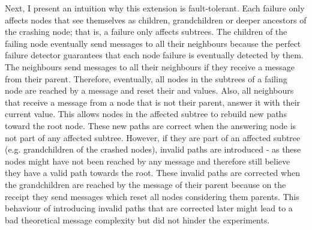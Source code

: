 Next, I present an intuition why this extension is fault-tolerant.
Each failure only affects nodes that see themselves as children, grandchildren or deeper ancestors of the crashing node; that is, a failure only affects subtrees.
The children of the failing node eventually send  messages to all their neighbours because the perfect failure detector guarantees that each node failure is eventually detected by them.
The neighbours send  messages to all their neighbours if they receive a  message from their parent.
Therefore, eventually, all nodes in the subtrees of a failing node are reached by a  message and reset their  and  values.
Also, all neighbours that receive a  message from a node that is not their parent, answer it with their current  value.
This allows nodes in the affected subtree to rebuild new paths toward the root node.
These new paths are correct when the answering node is not part of any affected subtree.
However, if they are part of an affected subtree (e.g. grandchildren of the crashed nodes), invalid paths are introduced - as these nodes might have not been reached by any  message and therefore still believe they have a valid path towards the root.
These invalid paths are corrected when the grandchildren are reached by the  message of their parent because on the receipt they send  messages which reset all nodes considering them parents.
This behaviour of introducing invalid paths that are corrected later might lead to a bad theoretical message complexity but did not hinder the experiments.

